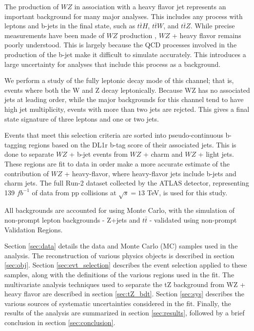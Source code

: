 
The production of $WZ$ in association with a heavy flavor jet represents an important background for many major analyses. This includes any process with leptons and b-jets in the final state, such as $t\bar{t}H$, $t\bar{t}W$, and $t\bar{t}Z$. While precise measurements have been made of $WZ$ production \cite{WZ_36}, $WZ$ + heavy flavor remains poorly understood. This is largely because the QCD processes involved in the production of the b-jet make it difficult to simulate accurately. This introduces a large uncertainty for analyses that include this process as a background.

We perform a study of the fully leptonic decay mode of this channel; that is, events where both the W and Z decay leptonically. Because WZ has no associated jets at leading order, while the major backgrounds for this channel tend to have high jet multiplicity, events with more than two jets are rejcted. This gives a final state signature of three leptons and one or two jets.

Events that meet this selection criteria are sorted into pseudo-continuous b-tagging regions based on the DL1r b-tag score of their associated jets. This is done to separate $WZ$ + b-jet events from $WZ$ + charm and $WZ$ + light jets. These regions are fit to data in order make a more accurate estimate of the contribution of $WZ$ + heavy-flavor, where heavy-flavor jets include b-jets and charm jets. The full Run-2 dataset collected by the ATLAS detector, representing 139 $fb^{-1}$ of data from pp collisions at $\sqrt{s} = 13$ TeV, is used for this study.

All backgrounds are accounted for using Monte Carlo, with the simulation of non-prompt lepton backgrounds - Z+jets and $t\bar{t}$ - validated using non-prompt Validation Regions.

Section \ref{sec:data} details the data and Monte Carlo (MC) samples used in the analysis. The reconstruction of various physics objects is described in section \ref{sec:obj}. Section \ref{sec:evt_selection} describes the event selection applied to these samples, along with the definitions of the various regions used in the fit. The multivariate analysis techniques used to separate the tZ background from WZ + heavy flavor are described in section \ref{sec:tZ_bdt}. Section \ref{sec:sys} describes the various sources of systematic uncertainties considered in the fit. Finally, the results of the analysis are summarized in section \ref{sec:results}, followed by a brief conclusion in section \ref{sec:conclusion}.

